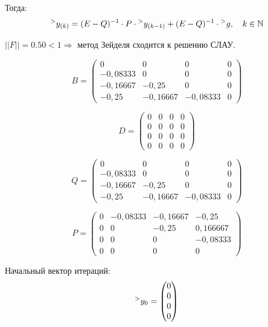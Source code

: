 \documentclass[14pt,a4paper]{scrartcl}
\begin{document}
\begin{figure}[h]
\end{figure}

Тогда:
\begin{equation*}
\prescript{>}{}{y_{(k)}} = (E-Q)^{-1} \cdot P \cdot \prescript{>}{}{y_{(k-1)}} + (E-Q)^{-1} \cdot \prescript{>}{}{g}, \quad k \in \mathbb{N}
\end{equation*}

$||F|| = 0.50 < 1 \Rightarrow $ метод Зейделя сходится к решению СЛАУ.

$$ B =
\begin{pmatrix}
0        & 0        & 0        & 0 \\
-0,08333 & 0        & 0        & 0 \\
-0,16667 & -0,25    & 0        & 0 \\
-0,25    & -0,16667 & -0,08333 & 0
\end{pmatrix}
$$

$$ D =
\begin{pmatrix}
0 & 0 & 0 & 0 \\
0 & 0 & 0 & 0 \\
0 & 0 & 0 & 0 \\
0 & 0 & 0 & 0
\end{pmatrix}
$$

$$ Q =
\begin{pmatrix}
0        & 0        & 0        & 0 \\
-0,08333 & 0        & 0        & 0 \\
-0,16667 & -0,25    & 0        & 0 \\
-0,25    & -0,16667 & -0,08333 & 0
\end{pmatrix}
$$

$$ P =
\begin{pmatrix}
0 & -0,08333 & -0,16667 & -0,25    \\
0 & 0        & -0,25    & 0,166667 \\
0 & 0        & 0        & -0,08333 \\
0 & 0        & 0        & 0   
\end{pmatrix}
$$

Начальный вектор итераций:
$$
\prescript{>}{}{y_0} = 
\begin{pmatrix}
0 \\
0 \\
0 \\
0
\end{pmatrix}
$$
\end{document}
